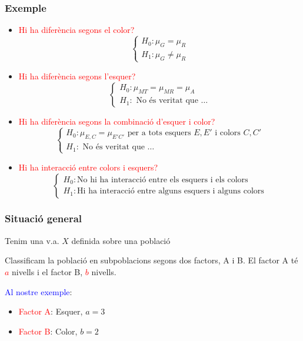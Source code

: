 \documentclass[12pt,t]{beamer}
\newcommand{\red}[1]{\textcolor{red}{#1}}
\newcommand{\blue}[1]{\textcolor{blue}{#1}}
\theoremstyle{plain}
\theoremstyle{definition}
\begin{document}
\begin{frame}
\frametitle{Exemple}\vspace*{-1ex}

\begin{itemize}
\item \red{Hi ha diferència segons el color?}
$$
\left\{
\begin{array}{l}
H_0 : \mu_G=\mu_{R} \\
H_1 : \mu_G\neq \mu_{R}
\end{array}
\right.
$$\pause

\item \red{Hi ha diferència segons l'esquer?}
$$
\left\{
\begin{array}{l}
H_0 : \mu_{MT}=\mu_{MR}=\mu_A \\
H_1 : \text{ No és veritat que \ldots}
\end{array}
\right.
$$\pause

\item \red{Hi ha diferència segons la combinació d'esquer i color?}
$$
\left\{
\begin{array}{l}
H_0 : \mu_{E,C}=\mu_{E'C'}\text{ per a tots esquers $E,E'$ i colors $C,C'$} \\
H_1 : \text{ No és veritat que \ldots}
\end{array}
\right.
$$\pause

\item \red{Hi ha interacció entre colors i esquers?}
$$
\left\{
\begin{array}{l}
H_0 : \text{No hi ha interacció entre els esquers i els colors} \\
H_1 : \text{Hi ha interacció entre alguns esquers i alguns colors}
\end{array}
\right.
$$
\end{itemize}
\end{frame}


\begin{frame}
\frametitle{Situació general} 

Tenim una v.a. $X$ definida sobre una població\medskip

Classificam la població en subpoblacions segons dos factors, A i B.  El factor A té \red{$a$} nivells i el factor B, \red{$b$} nivells.
\medskip

\blue{Al nostre exemple}:
\begin{itemize}
\item \red{Factor A}: Esquer, $a=3$
\item \red{Factor B}: Color, $b=2$
\end{itemize}

\end{frame}
\end{document}
